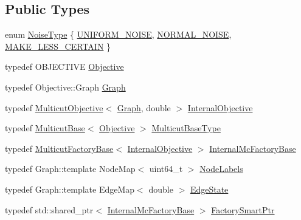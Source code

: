 \subsection*{Public Types}
\begin{DoxyCompactItemize}
\item 
enum \hyperlink{classnifty_1_1graph_1_1PerturbAndMap_adb807003c7f4b10bc0b4d931ba8d8a00}{Noise\+Type} \{ \hyperlink{classnifty_1_1graph_1_1PerturbAndMap_adb807003c7f4b10bc0b4d931ba8d8a00ab3fc33ca907849e9193a9a41e5513eed}{U\+N\+I\+F\+O\+R\+M\+\_\+\+N\+O\+I\+S\+E}, 
\hyperlink{classnifty_1_1graph_1_1PerturbAndMap_adb807003c7f4b10bc0b4d931ba8d8a00a34fe2ad869315ddcfa0c985ce9c0fc6f}{N\+O\+R\+M\+A\+L\+\_\+\+N\+O\+I\+S\+E}, 
\hyperlink{classnifty_1_1graph_1_1PerturbAndMap_adb807003c7f4b10bc0b4d931ba8d8a00a1edbb28831e810515a4c10c965429c7d}{M\+A\+K\+E\+\_\+\+L\+E\+S\+S\+\_\+\+C\+E\+R\+T\+A\+I\+N}
 \}
\item 
typedef O\+B\+J\+E\+C\+T\+I\+V\+E \hyperlink{classnifty_1_1graph_1_1PerturbAndMap_a472da1848b099c685994a2cc915b02ed}{Objective}
\item 
typedef Objective\+::\+Graph \hyperlink{classnifty_1_1graph_1_1PerturbAndMap_a8c74ad131238a83d5abfdf99e726f00f}{Graph}
\item 
typedef \hyperlink{classnifty_1_1graph_1_1MulticutObjective}{Multicut\+Objective}$<$ \hyperlink{classnifty_1_1graph_1_1PerturbAndMap_a8c74ad131238a83d5abfdf99e726f00f}{Graph}, double $>$ \hyperlink{classnifty_1_1graph_1_1PerturbAndMap_a30b65b32da50e2c0cc369e3942dd15ff}{Internal\+Objective}
\item 
typedef \hyperlink{classnifty_1_1graph_1_1MulticutBase}{Multicut\+Base}$<$ \hyperlink{classnifty_1_1graph_1_1PerturbAndMap_a472da1848b099c685994a2cc915b02ed}{Objective} $>$ \hyperlink{classnifty_1_1graph_1_1PerturbAndMap_a5727b6e7c9ec80660ff94d9ccace8fe5}{Multicut\+Base\+Type}
\item 
typedef \hyperlink{classnifty_1_1graph_1_1MulticutFactoryBase}{Multicut\+Factory\+Base}$<$ \hyperlink{classnifty_1_1graph_1_1PerturbAndMap_a30b65b32da50e2c0cc369e3942dd15ff}{Internal\+Objective} $>$ \hyperlink{classnifty_1_1graph_1_1PerturbAndMap_a8feaddb2d6ce39525544faf3a5a9dff9}{Internal\+Mc\+Factory\+Base}
\item 
typedef Graph\+::template Node\+Map$<$ uint64\+\_\+t $>$ \hyperlink{classnifty_1_1graph_1_1PerturbAndMap_aaf657e3c33a321710e6db17adb3df3ff}{Node\+Labels}
\item 
typedef Graph\+::template Edge\+Map$<$ double $>$ \hyperlink{classnifty_1_1graph_1_1PerturbAndMap_aecae76ea82e2ee66c5f8186132c88a5c}{Edge\+State}
\item 
typedef std\+::shared\+\_\+ptr$<$ \hyperlink{classnifty_1_1graph_1_1PerturbAndMap_a8feaddb2d6ce39525544faf3a5a9dff9}{Internal\+Mc\+Factory\+Base} $>$ \hyperlink{classnifty_1_1graph_1_1PerturbAndMap_a815db966f32373a375bb54709027997b}{Factory\+Smart\+Ptr}
\end{DoxyCompactItemize}
